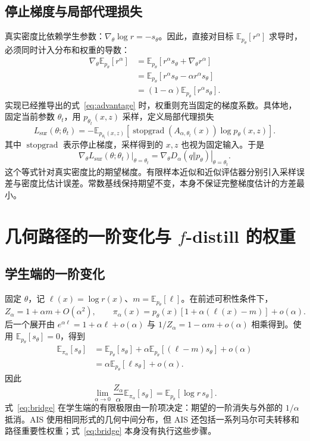 \documentclass[UTF8,fontset=none,11pt,a4paper]{ctexart}
\newcommand{\E}{\mathbb E}
\newcommand{\sg}{\operatorname{stopgrad}}
\begin{document}
\subsection{停止梯度与局部代理损失}
真实密度比依赖学生参数：$\nabla_\theta\log r=-s_\theta$。因此，直接对目标 $\E_{p_\theta}[r^\alpha]$ 求导时，必须同时计入分布和权重的导数：
\[
\begin{aligned}
\nabla_\theta\E_{p_\theta}[r^\alpha]
&=\E_{p_\theta}[r^\alpha s_\theta+\nabla_\theta r^\alpha]\\
&=\E_{p_\theta}[r^\alpha s_\theta-\alpha r^\alpha s_\theta]\\
&=(1-\alpha)\E_{p_\theta}[r^\alpha s_\theta].
\end{aligned}
\]
实现已经推导出的式~\eqref{eq:advantage} 时，权重则充当固定的梯度系数。具体地，固定当前参数 $\theta_t$，用 $p_{\theta_t}(x,z)$ 采样，定义局部代理损失
\[
L_{\mathrm{sur}}(\theta;\theta_t)
=-\E_{p_{\theta_t}(x,z)}
\left[\sg(A_{\alpha,\theta_t}(x))\log p_\theta(x,z)\right].
\]
其中 $\sg$ 表示停止梯度，采样得到的 $x,z$ 也视为固定输入。于是
\[
\left.\nabla_\theta L_{\mathrm{sur}}(\theta;\theta_t)\right|_{\theta=\theta_t}
=\left.\nabla_\theta D_\alpha(q\Vert p_\theta)\right|_{\theta=\theta_t}.
\]
这个等式针对真实密度比的期望梯度。有限样本近似和近似评估器分别引入采样误差与密度比估计误差。常数基线保持期望不变，本身不保证完整梯度估计的方差最小。

\section{几何路径的一阶变化与 \texorpdfstring{$f$}{f}-distill 的权重}

\subsection{学生端的一阶变化}
固定 $\theta$，记 $\ell(x)=\log r(x)$、$m=\E_{p_\theta}[\ell]$。在前述可积性条件下，
\[
Z_\alpha=1+\alpha m+O(\alpha^2),
\qquad
\pi_\alpha(x)
=p_\theta(x)\left[1+\alpha(\ell(x)-m)\right]+o(\alpha).
\]
后一个展开由 $e^{\alpha\ell}=1+\alpha\ell+o(\alpha)$ 与 $1/Z_\alpha=1-\alpha m+o(\alpha)$ 相乘得到。使用 $\E_{p_\theta}[s_\theta]=0$，得到
\[
\begin{aligned}
\E_{\pi_\alpha}[s_\theta]
&=\E_{p_\theta}[s_\theta]
+\alpha\E_{p_\theta}[(\ell-m)s_\theta]+o(\alpha)\\
&=\alpha\E_{p_\theta}[\ell s_\theta]+o(\alpha).
\end{aligned}
\]
因此
\[
\lim_{\alpha\to0}\frac{Z_\alpha}{\alpha}\E_{\pi_\alpha}[s_\theta]
=\E_{p_\theta}[\log r\,s_\theta].
\]
式~\eqref{eq:bridge} 在学生端的有限极限由一阶项决定：期望的一阶消失与外部的 $1/\alpha$ 抵消。AIS 使用相同形式的几何中间分布，但 AIS 还包括一系列马尔可夫转移和路径重要性权重；式~\eqref{eq:bridge} 本身没有执行这些步骤\cite{neal2001}。
\end{document}
